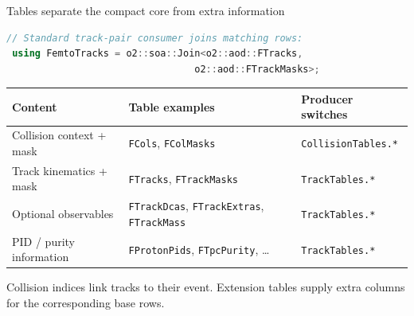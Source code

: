 \begin{frame}[fragile]{Tables separate the compact core from extra information}
 \begin{lstlisting}[language=C++]
 // Standard track-pair consumer joins matching rows:
 using FemtoTracks = o2::soa::Join<o2::aod::FTracks,
                                 o2::aod::FTrackMasks>;
 \end{lstlisting}
 \small
 \renewcommand{\arraystretch}{1.25}
 \begin{tabular}{p{}p{}p{}}
 \toprule
 Content & Table examples & Producer switches\\
 \midrule
 Collision context + mask & \texttt{FCols}, \texttt{FColMasks} & \texttt{CollisionTables.*}\\
 Track kinematics + mask & \texttt{FTracks}, \texttt{FTrackMasks} & \texttt{TrackTables.*}\\
 Optional observables & \texttt{FTrackDcas}, \texttt{FTrackExtras}, \texttt{FTrackMass} & \texttt{TrackTables.*}\\
 PID / purity information & \texttt{FProtonPids}, \texttt{FTpcPurity}, \ldots & \texttt{TrackTables.*}\\
 \bottomrule
 \end{tabular}
 \medskip
 Collision indices link tracks to their event. Extension tables supply extra columns for the corresponding base rows.
\end{frame}

